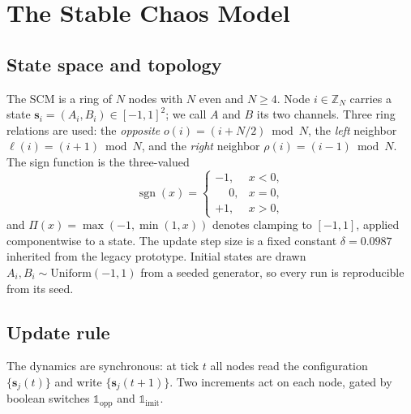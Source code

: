 \documentclass[11pt]{article}
\DeclareMathOperator{\sgn}{sgn}
\newcommand{\clamp}{\Pi}
\newcommand{\stvec}{\mathbf{s}}
\begin{document}
\section{The Stable Chaos Model}
\label{sec:scm}

\subsection{State space and topology}
The SCM is a ring of $N$ nodes with $N$ even and $N\ge 4$. Node $i\in\mathbb{Z}_N$ carries a state
$\stvec_i=(A_i,B_i)\in[-1,1]^2$; we call $A$ and $B$ its two channels. Three ring relations are used: the
\emph{opposite} $o(i)=(i+N/2)\bmod N$, the \emph{left} neighbor $\ell(i)=(i+1)\bmod N$, and the \emph{right}
neighbor $\rho(i)=(i-1)\bmod N$. The sign function is the three-valued
\begin{equation}
\sgn(x)=\begin{cases} -1, & x<0,\\ \phantom{-}0, & x=0,\\ +1, & x>0,\end{cases}
\end{equation}
and $\clamp(x)=\max(-1,\min(1,x))$ denotes clamping to $[-1,1]$, applied componentwise to a state. The update step
size is a fixed constant $\delta=0.0987$ inherited from the legacy prototype. Initial states are drawn
$A_i,B_i\sim\mathrm{Uniform}(-1,1)$ from a seeded generator, so every run is reproducible from its seed.

\subsection{Update rule}
The dynamics are synchronous: at tick $t$ all nodes read the configuration $\{\stvec_j(t)\}$ and write
$\{\stvec_j(t+1)\}$. Two increments act on each node, gated by boolean switches $\mathbb{1}_{\mathrm{opp}}$ and
$\mathbb{1}_{\mathrm{imit}}$.
\end{document}
